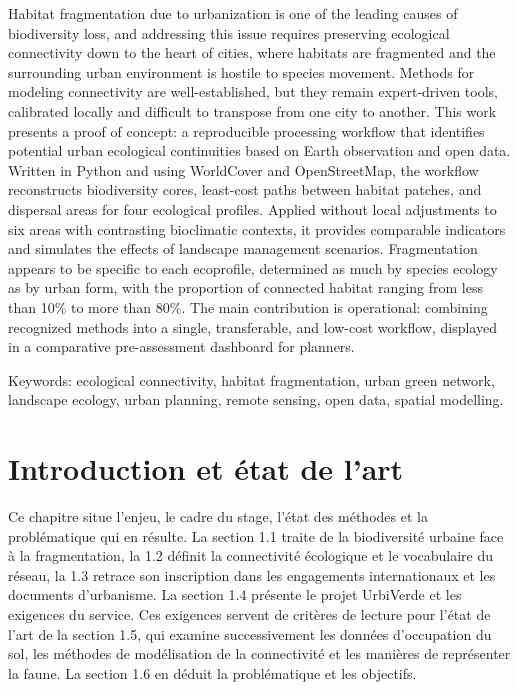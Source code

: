 \documentclass[a4paper,12pt]{report}
\begin{document}
Habitat fragmentation due to urbanization is one of the leading causes of biodiversity loss, and addressing this issue requires preserving ecological connectivity down to the heart of cities, where habitats are fragmented and the surrounding urban environment is hostile to species movement. Methods for modeling connectivity are well-established, but they remain expert-driven tools, calibrated locally and difficult to transpose from one city to another. This work presents a proof of concept: a reproducible processing workflow that identifies potential urban ecological continuities based on Earth observation and open data. Written in Python and using WorldCover and OpenStreetMap, the workflow reconstructs biodiversity cores, least-cost paths between habitat patches, and dispersal areas for four ecological profiles. Applied without local adjustments to six areas with contrasting bioclimatic contexts, it provides comparable indicators and simulates the effects of landscape management scenarios. Fragmentation appears to be specific to each ecoprofile, determined as much by species ecology as by urban form, with the proportion of connected habitat ranging from less than 10\% to more than 80\%. The main contribution is operational: combining recognized methods into a single, transferable, and low-cost workflow, displayed in a comparative pre-assessment dashboard for planners.

Keywords: ecological connectivity, habitat fragmentation, urban green network, landscape ecology, urban planning, remote sensing, open data, spatial modelling.

\clearpage

\begingroup
\renewcommand{\contentsname}{Sommaire}
\tableofcontents
\endgroup
\clearpage

\chapter{Introduction et état de l'art}
Ce chapitre situe l'enjeu, le cadre du stage, l'état des méthodes et la problématique qui en résulte. La section 1.1 traite de la biodiversité urbaine face à la fragmentation, la 1.2 définit la connectivité écologique et le vocabulaire du réseau, la 1.3 retrace son inscription dans les engagements internationaux et les documents d'urbanisme. La section 1.4 présente le projet UrbiVerde et les exigences du service. Ces exigences servent de critères de lecture pour l'état de l'art de la section 1.5, qui examine successivement les données d'occupation du sol, les méthodes de modélisation de la connectivité et les manières de représenter la faune. La section 1.6 en déduit la problématique et les objectifs.
\end{document}
